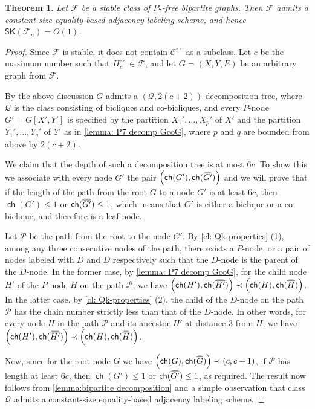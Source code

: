 \documentclass{article}
\newtheorem{theorem}{Theorem}\newtheorem{lemma}[theorem]{Lemma}\newtheorem{proposition}[theorem]{Proposition}\newtheorem{corollary}[theorem]{Corollary}\newtheorem{definition}[theorem]{Definition}\newtheorem{claim}[theorem]{Claim}\newtheorem{remark}[theorem]{Remark}\newtheorem{observation}[theorem]{Observation}\newtheorem{conjecture}[theorem]{Conjecture}\newtheorem{example}[theorem]{Example}
\newcommand{\cC}{\ensuremath{\mathcal{C}}}
\newcommand{\cF}{\ensuremath{\mathcal{F}}}
\newcommand{\cP}{\ensuremath{\mathcal{P}}}
\newcommand{\cQ}{\ensuremath{\mathcal{Q}}}
\newcommand\doverline[1]{%
  \setbox0=\hbox{$\!\overline{#1}\!$}%
  \ht0=\dimexpr\ht0-.2ex\relax%
  \,\overline{\copy0}\,%
}
\newcommand{\bc}[1]{\doverline{#1}} %
\newcommand{\RL}{\mathsf{SK}}
\DeclareMathOperator\ch{\mathsf{ch}}
\newcommand{\dcirc}{{\circ\circ}}
\begin{document}
\begin{theorem}
	\label{th:P7 labeling}
	Let $\cF$ be a stable class of $P_7$-free bipartite graphs.
	Then $\cF$ admits a constant-size equality-based adjacency labeling scheme, and hence $\RL(\cF_n) = O(1)$.
\end{theorem}
\begin{proof}
	Since $\cF$ is stable, it does not contain $\cC^\dcirc$ as a subclass.
	Let $c$ be the maximum number such that $H^{\circ\circ}_c \in \cF$,
	and let $G=(X,Y,E)$ be an arbitrary graph from $\cF$.
	
	By the above discussion $G$ admits
	a $(\cQ, 2(c+2))$-decomposition tree, where $\cQ$ is the class consisting of bicliques and co-bicliques, and every $P$-node $G' = G[X',Y']$ is specified
	by the partition $X_1', \ldots, X_p'$ of $X'$ and the partition $Y_1', \ldots, Y_q'$ of $Y'$
	as in \cref{lemma: P7 decomp GcoG}, where $p$ and $q$ are bounded from above by $2(c+2)$.
	
	We claim that the depth of such a decomposition tree is at most $6c$.
	To show this we associate with every node $G'$ the pair $\left( \ch(G'), \ch(\bc{G'}) \right)$
	and we will prove that if the length of the path from  the root $G$ to a node $G'$ is at least
	$6c$, then $\ch(G') \leq 1$ or $\ch(\bc{G'}) \leq 1$, which means that $G'$ is either
	a biclique or a co-biclique, and therefore is a leaf node.
	
	Let $\cP$ be the path from the root to the node $G'$.
	By \cref{cl: Qk-properties} (1), among any three consecutive nodes of the path,
	there exists a $P$-node, or a pair of nodes labeled with $\overline D$ and $D$ respectively
	such that the $\overline D$-node is the parent of the $D$-node.
	In the former case, by \cref{lemma: P7 decomp GcoG}, 
	for the child node $H'$ of the $P$-node $H$ on the path $\cP$, we have 
	$\left( \ch(H'), \ch(\bc{H'}) \right) \prec \left( \ch(H), \ch(\bc{H}) \right)$.
	In the latter case, by \cref{cl: Qk-properties} (2), the child of the $D$-node
	on the path $\cP$ has the chain number strictly less than that of the $D$-node.
	In other words, for every node $H$ in the path $\cP$ and its ancestor $H'$ at distance
	$3$ from $H$, we have  $\left( \ch(H'), \ch(\bc{H'}) \right) \prec \left( \ch(H), \ch(\bc{H}) \right)$.
	
	Now, since for the root node $G$ we have $\left( \ch(G), \ch(\bc{G}) \right) \prec (c, c+1)$,
	if $\cP$ has length at least $6c$, then $\ch(G') \leq 1$ or $\ch(\bc{G'}) \leq 1$, as required. 
	The result now follows from \cref{lemma:bipartite decomposition} and a simple observation
	that class $\cQ$ admits a constant-size equality-based adjacency labeling scheme.
\end{proof}
\end{document}
